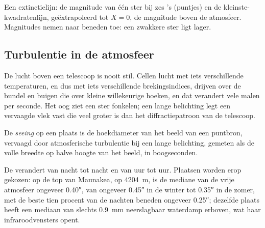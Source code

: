 \begin{omfigure}

{\small Een extinctielijn: de magnitude van één ster bij zes 's (puntjes)
en de kleinste-kwadratenlijn, geëxtrapoleerd tot $X = 0$, de magnitude boven de
atmosfeer. Magnitudes nemen naar beneden toe: een zwakkere ster ligt lager.}
\end{omfigure}

\subsection*{Turbulentie in de atmosfeer}

De lucht boven een telescoop is nooit stil. Cellen lucht met iets verschillende
temperaturen, en dus met iets verschillende brekingsindices, drijven over de
bundel en buigen die over kleine willekeurige hoeken, en dat verandert vele malen
per seconde. Het oog ziet een ster fonkelen; een lange belichting legt een vervaagde
vlek vast die veel groter is dan het diffractiepatroon van de telescoop.

\begin{definition}\label{def:b1:observing-the-sky:seeing}
De \emph{seeing} op een plaats is de hoekdiameter van het beeld van een
puntbron, vervaagd door atmosferische turbulentie bij een lange belichting, gemeten
als de volle breedte op halve hoogte van het beeld, in boogseconden.
\end{definition}

De  verandert van nacht tot nacht en van uur tot uur. Plaatsen worden erop
gekozen: op de top van Maunakea, op \qty{4204}{m}, is de mediane  van de vrije
atmosfeer ongeveer \ang{;;0.40}, van ongeveer \ang{;;0.45} in de winter tot \ang{;;0.35}
in de zomer, met de beste tien procent van de nachten beneden ongeveer \ang{;;0.25};
dezelfde plaats heeft een mediaan van slechts \qty{0.9}{mm} neerslagbaar waterdamp
erboven, wat haar infraroodvensters opent.

